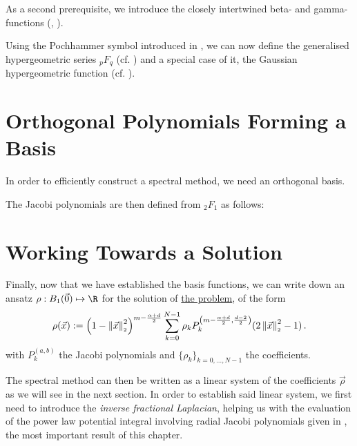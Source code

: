 As a second prerequisite, we introduce the closely intertwined beta- and gamma-functions (, ).



Using the Pochhammer symbol introduced in , we can now define the generalised hypergeometric series ${}_pF_q$ (cf. ) and a special case of it, the Gaussian hypergeometric function (cf. ).



\pagebreak
\section{Orthogonal Polynomials Forming a Basis}
In order to efficiently construct a spectral method, we need an orthogonal basis.



The Jacobi polynomials are then defined from ${}_2F_1$ as follows:

% 
% 


\section{Working Towards a Solution}
Finally, now that we have established the basis functions, we can write down an ansatz $\rho: B_1(\vec{0}) \mapsto \R$ for the solution of \hyperref[def:the-problem]{the problem}, of the form
\begin{equation}
  \rho(\vec{x}) := \left(1-\left\lVert\vec{x}\right\rVert_{\scriptscriptstyle 2}^{2}\right)^{m - \frac{\alpha + d}{2}} \sum_{k=0}^{N-1} \rho_k P_{k}^{\left(m - \frac{\alpha + d}{2},\frac{d-2}{2}\right)}(2 \left\lVert\vec{x}\right\rVert_{\scriptscriptstyle 2}^{2}-1)\,.
  \label{eq:ansatz}
\end{equation}
with $P_k^{(a, b)}$ the Jacobi polynomials and $\{\rho_k\}_{k=0, ..., N-1}$ the coefficients.

The spectral method can then be written as a linear system of the coefficients $\vec{\rho}$ as we will see in the next section.
In order to establish said linear system, we first need to introduce the \textit{inverse fractional Laplacian}, helping us with the evaluation of the power law potential integral involving radial Jacobi polynomials given in , the most important result of this chapter.

